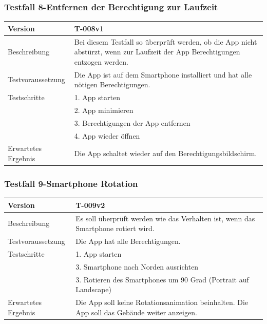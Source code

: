 \documentclass[a4paper]{scrreprt}
\begin{document}
\subsubsection{Testfall 8-Entfernen der Berechtigung zur Laufzeit}
\begin{tabularx}{\textwidth}{|l|X|}
\hline
	Version &
	T-008v1 \\ 
\hline 
	Beschreibung & 
	Bei diesem Testfall so überprüft werden, ob die App nicht abstürzt, wenn zur Laufzeit der App Berechtigungen entzogen werden. \\ 
\hline 
	Testvoraussetzung &
	Die App ist auf dem Smartphone installiert und hat alle nötigen Berechtigungen. \\ 
\hline 
	Testschritte & 
		1. App starten\\ &
		2. App minimieren\\ &
		3. Berechtigungen der App entfernen\\ &
		4. App wieder öffnen\\
\hline
	Erwartetes Ergebnis &
	Die App schaltet wieder auf den Berechtigungsbildschirm. \\
\hline
\end{tabularx}
\subsubsection{Testfall 9-Smartphone Rotation}
\begin{tabularx}{\textwidth}{|l|X|}
\hline
	Version &
	T-009v2 \\
\hline
	Beschreibung &
	Es soll überprüft werden wie das Verhalten ist, wenn das Smartphone rotiert wird. \\
\hline
	Testvoraussetzung &
	Die App hat alle Berechtigungen. \\ 
\hline 
	Testschritte & 
		1. App starten\\ &
		3. Smartphone nach Norden ausrichten\\ &
		3. Rotieren des Smartphones um 90 Grad (Portrait auf Landscape)\\
\hline
	Erwartetes Ergebnis &
	Die App soll keine Rotationsanimation beinhalten. Die App soll das Gebäude weiter anzeigen. \\
\hline
\end{tabularx}
\end{document}
